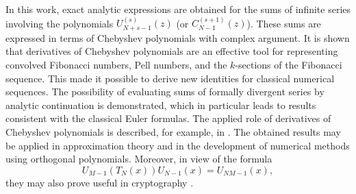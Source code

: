 \documentclass{article}
\begin{document}
In this work, exact analytic expressions are obtained for the sums of infinite series involving the polynomials $U_{N + s - 1}^{(s)}(z)$ (or $C_{N - 1}^{(s + 1)}(z)$). These sums are expressed in terms of Chebyshev polynomials with complex argument. It is shown that derivatives of Chebyshev polynomials are an effective tool for representing convolved Fibonacci numbers, Pell numbers, and the $k$-sections of the Fibonacci sequence. This made it possible to derive new identities for classical numerical sequences. The possibility of evaluating sums of formally divergent series by analytic continuation is demonstrated, which in particular leads to results consistent with the classical Euler formulas. The applied role of derivatives of Chebyshev polynomials is described, for example, in \cite{ref13}. The obtained results may be applied in approximation theory and in the development of numerical methods using orthogonal polynomials. Moreover, in view of the formula
$$
U_{M - 1}(T_N(x))U_{N - 1}(x) = U_{NM-1}(x),
$$
they may also prove useful in cryptography \cite{ref14}.



\end{document}
